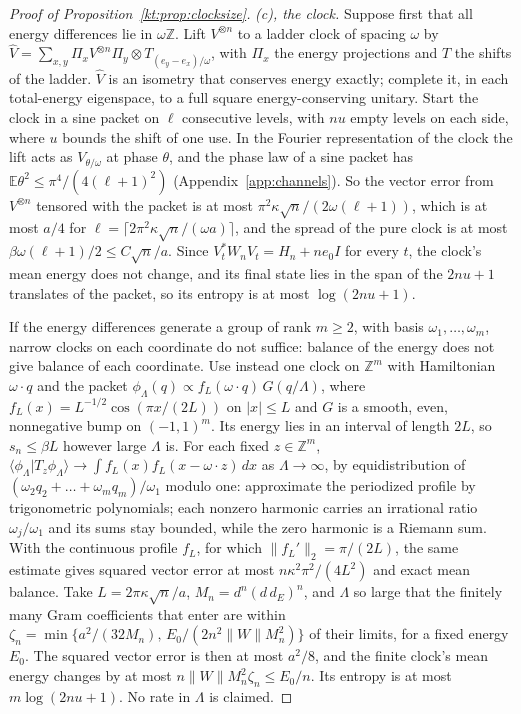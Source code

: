 \begin{proof}[Proof of Proposition~\ref{kt:prop:clocksize}]
\emph{(c), the clock.} Suppose first that all energy differences lie in $\omega\mathbb Z$. Lift $V^{\otimes n}$ to a ladder clock of spacing $\omega$ by $\hat V=\sum_{x,y}\Pi_xV^{\otimes n}\Pi_y\otimes T_{(e_y-e_x)/\omega}$, with $\Pi_x$ the energy projections and $T$ the shifts of the ladder. $\hat V$ is an isometry that conserves energy exactly; complete it, in each total-energy eigenspace, to a full square energy-conserving unitary. Start the clock in a sine packet on $\ell$ consecutive levels, with $nu$ empty levels on each side, where $u$ bounds the shift of one use. In the Fourier representation of the clock the lift acts as $V_{\theta/\omega}$ at phase $\theta$, and the phase law of a sine packet has $\mathbb E\theta^2\le\pi^4/(4(\ell+1)^2)$ (Appendix~\ref{app:channels}). So the vector error from $V^{\otimes n}$ tensored with the packet is at most $\pi^2\kappa\sqrt n/(2\omega(\ell+1))$, which is at most $a/4$ for $\ell=\lceil2\pi^2\kappa\sqrt n/(\omega a)\rceil$, and the spread of the pure clock is at most $\beta\omega(\ell+1)/2\le C\sqrt n/a$. Since $V_t^*W_nV_t=H_n+ne_0I$ for every $t$, the clock's mean energy does not change, and its final state lies in the span of the $2nu+1$ translates of the packet, so its entropy is at most $\log(2nu+1)$.

If the energy differences generate a group of rank $m\ge2$, with basis $\omega_1,\dots,\omega_m$, narrow clocks on each coordinate do not suffice: balance of the energy does not give balance of each coordinate. Use instead one clock on $\mathbb Z^m$ with Hamiltonian $\omega\cdot q$ and the packet $\phi_\Lambda(q)\propto f_L(\omega\cdot q)\,G(q/\Lambda)$, where $f_L(x)=L^{-1/2}\cos(\pi x/(2L))$ on $|x|\le L$ and $G$ is a smooth, even, nonnegative bump on $(-1,1)^m$. Its energy lies in an interval of length $2L$, so $s_n\le\beta L$ however large $\Lambda$ is. For each fixed $z\in\mathbb Z^m$, $\langle\phi_\Lambda|T_z\phi_\Lambda\rangle\to\int f_L(x)f_L(x-\omega\cdot z)\,dx$ as $\Lambda\to\infty$, by equidistribution of $(\omega_2q_2+\dots+\omega_mq_m)/\omega_1$ modulo one: approximate the periodized profile by trigonometric polynomials; each nonzero harmonic carries an irrational ratio $\omega_j/\omega_1$ and its sums stay bounded, while the zero harmonic is a Riemann sum. With the continuous profile $f_L$, for which $\|f_L'\|_2=\pi/(2L)$, the same estimate gives squared vector error at most $n\kappa^2\pi^2/(4L^2)$ and exact mean balance. Take $L=2\pi\kappa\sqrt n/a$, $M_n=d^n(d\,d_E)^n$, and $\Lambda$ so large that the finitely many Gram coefficients that enter are within $\zeta_n=\min\{a^2/(32M_n),\,E_0/(2n^2\|W\|M_n^2)\}$ of their limits, for a fixed energy $E_0$. The squared vector error is then at most $a^2/8$, and the finite clock's mean energy changes by at most $n\|W\|M_n^2\zeta_n\le E_0/n$. Its entropy is at most $m\log(2nu+1)$. No rate in $\Lambda$ is claimed.


\end{proof}
